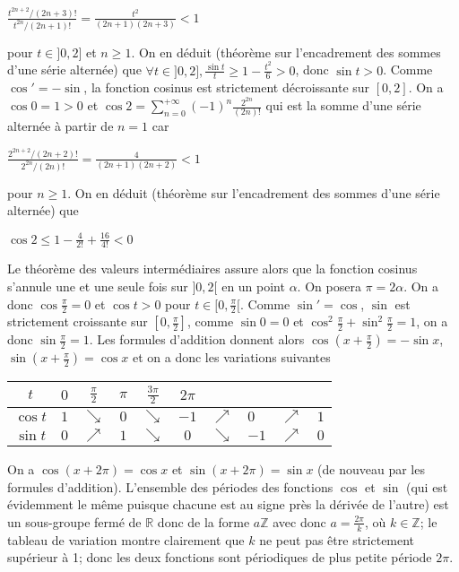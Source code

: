 $\frac{t^{2n+2}/(2n+3)!}{t^{2n}/(2n+1)!} = \frac{t^2}{(2n+1)(2n+3)} < 1$

pour $t \in ]0,2]$ et $n \geq 1$. On en déduit (théorème sur l'encadrement des sommes d'une série alternée) que $\forall t \in ]0,2], \frac{\sin t}{t} \geq 1 - \frac{t^2}{6} > 0$, donc $\sin t > 0$. Comme $\cos' = -\sin$, la fonction cosinus est strictement décroissante sur $[0,2]$. On a $\cos 0 = 1 > 0$ et $\cos 2 = \sum_{n=0}^{+\infty} (-1)^n \frac{2^{2n}}{(2n)!}$ qui est la somme d'une série alternée à partir de $n = 1$ car

$\frac{2^{2n+2}/(2n+2)!}{2^{2n}/(2n)!} = \frac{4}{(2n+1)(2n+2)} < 1$

pour $n \geq 1$. On en déduit (théorème sur l'encadrement des sommes d'une série alternée) que

$\cos 2 \leq 1 - \frac{4}{2!} + \frac{16}{4!} < 0$

Le théorème des valeurs intermédiaires assure alors que la fonction cosinus s'annule une et une seule fois sur $]0,2[$ en un point $\alpha$. On posera $\pi = 2\alpha$. On a donc $\cos \frac{\pi}{2} = 0$ et $\cos t > 0$ pour $t \in [0, \frac{\pi}{2}[$. Comme $\sin' = \cos$, $\sin$ est strictement croissante sur $[0, \frac{\pi}{2}]$, comme $\sin 0 = 0$ et $\cos^2 \frac{\pi}{2} + \sin^2 \frac{\pi}{2} = 1$, on a donc $\sin \frac{\pi}{2} = 1$. Les formules d'addition donnent alors $\cos(x + \frac{\pi}{2}) = -\sin x$, $\sin(x + \frac{\pi}{2}) = \cos x$ et on a donc les variations suivantes

\begin{center}
\begin{tabular}{|c|c|c|c|c|c|}
\hline
$t$ & $0$ & $\frac{\pi}{2}$ & $\pi$ & $\frac{3\pi}{2}$ & $2\pi$ \\
\hline
$\cos t$ & $1$ & $\searrow$ & $0$ & $\searrow$ & $-1$ & $\nearrow$ & $0$ & $\nearrow$ & $1$ \\
\hline
$\sin t$ & $0$ & $\nearrow$ & $1$ & $\searrow$ & $0$ & $\searrow$ & $-1$ & $\nearrow$ & $0$ \\
\hline
\end{tabular}
\end{center}

On a $\cos(x + 2\pi) = \cos x$ et $\sin(x + 2\pi) = \sin x$ (de nouveau par les formules d'addition). L'ensemble des périodes des fonctions $\cos$ et $\sin$ (qui est évidemment le même puisque chacune est au signe près la dérivée de l'autre) est un sous-groupe fermé de $\mathbb{R}$ donc de la forme $a\mathbb{Z}$ avec donc $a = \frac{2\pi}{k}$, où $k \in \mathbb{Z}$; le tableau de variation montre clairement que $k$ ne peut pas être strictement supérieur à 1; donc les deux fonctions sont périodiques de plus petite période $2\pi$.

